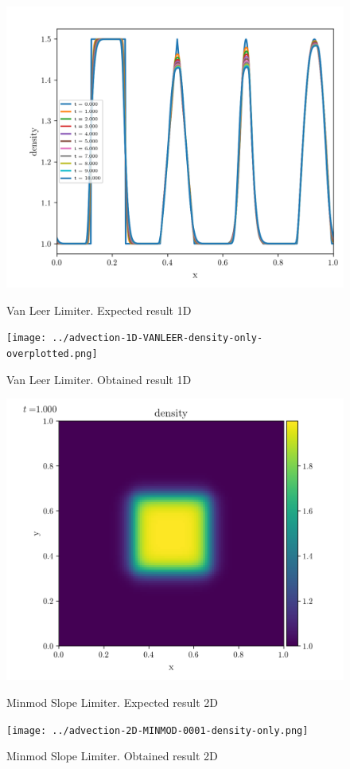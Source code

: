 \begin{figure}[htbp]
    \centering
	\includegraphics[width=.7\textwidth]{./figures/advection-1D-VANLEER-density-only-overplotted.png}%
	\caption{Van Leer Limiter. Expected result 1D}
	\texttt{[image: ../advection-1D-VANLEER-density-only-overplotted.png]}%
	\caption{Van Leer Limiter. Obtained result 1D}
\end{figure}





\begin{figure}[htbp]
    \centering
	\includegraphics[width=.7\textwidth]{./figures/advection-2D-MINMOD-0001-density-only.png}%
	\caption{Minmod Slope Limiter. Expected result 2D}
	\texttt{[image: ../advection-2D-MINMOD-0001-density-only.png]}%
	\caption{Minmod Slope Limiter. Obtained result 2D}
\end{figure}


